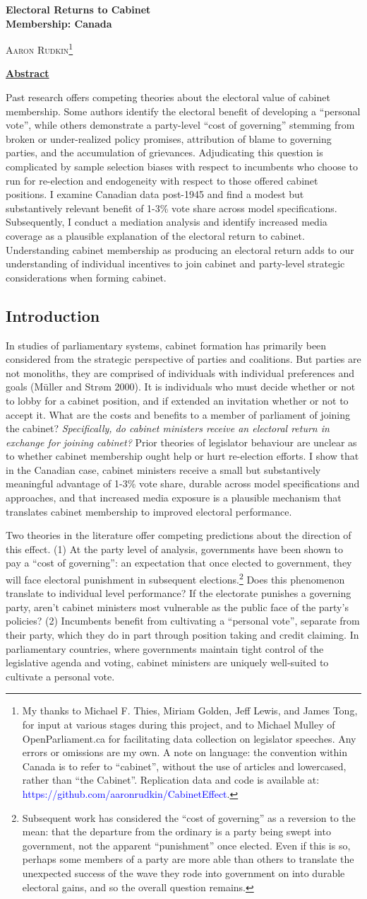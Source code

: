 \documentclass[letter,12pt]{article}
\newcommand*{\customTitle}{\begingroup
\pagestyle{empty}
\vspace*{0.05\textheight}
\noindent\Huge\bfseries Electoral Returns to Cabinet \\ Membership: Canada
\vspace*{0.05\textheight}

\noindent\Large \textsc{Aaron Rudkin\footnote{My thanks to Michael F. Thies, Miriam Golden, Jeff Lewis, and James Tong, for input at various stages during this project, and to Michael Mulley of OpenParliament.ca for facilitating data collection on legislator speeches. Any errors or omissions are my own. A note on language: the convention within Canada is to refer to ``cabinet'', without the use of articles and lowercased, rather than ``the Cabinet''. Replication data and code is available at: \textcolor{blue}{https://github.com/aaronrudkin/CabinetEffect}.}}
\vspace*{0.1\textheight}

\normalsize
\textbf{\underline{Abstract}}

\textmd{Past research offers competing theories about the electoral value of cabinet membership. Some authors identify the electoral benefit of developing a ``personal vote'', while others demonstrate a party-level ``cost of governing'' stemming from broken or under-realized policy promises, attribution of blame to governing parties, and the accumulation of grievances. Adjudicating this question is complicated by sample selection biases with respect to incumbents who choose to run for re-election and endogeneity with respect to those offered cabinet positions. I examine Canadian data post-1945 and find a modest but substantively relevant benefit of 1-3\% vote share across model specifications. Subsequently, I conduct a mediation analysis and identify increased media coverage as a plausible explanation of the electoral return to cabinet. Understanding cabinet membership as producing an electoral return adds to our understanding of individual incentives to join cabinet and party-level strategic considerations when forming cabinet.}

\newpage
\endgroup}
\begin{document}
\customTitle

\setlength{\parindent}{24pt}

\subsection*{Introduction}
In studies of parliamentary systems, cabinet formation has primarily been considered from the strategic perspective of parties and coalitions. But parties are not monoliths, they are comprised of individuals with individual preferences and goals (M{\"u}ller and Str{\o}m 2000). It is individuals who must decide whether or not to lobby for a cabinet position, and if extended an invitation whether or not to accept it. What are the costs and benefits to a member of parliament of joining the cabinet? \textit{Specifically, do cabinet ministers receive an electoral return in exchange for joining cabinet?} Prior theories of legislator behaviour are unclear as to whether cabinet membership ought help or hurt re-election efforts. I show that in the Canadian case, cabinet ministers receive a small but substantively meaningful advantage of 1-3\% vote share, durable across model specifications and approaches, and that increased media exposure is a plausible mechanism that translates cabinet membership to improved electoral performance.

Two theories in the literature offer competing predictions about the direction of this effect. (1) At the party level of analysis, governments have been shown to pay a ``cost of governing'': an expectation that once elected to government, they will face electoral punishment in subsequent elections.\footnote{Subsequent work has considered the ``cost of governing'' as a reversion to the mean: that the departure from the ordinary is a party being swept into government, not the apparent ``punishment'' once elected. Even if this is so, perhaps some members of a party are more able than others to translate the unexpected success of the wave they rode into government on into durable electoral gains, and so the overall question remains.} Does this phenomenon translate to individual level performance? If the electorate punishes a governing party, aren't cabinet ministers most vulnerable as the public face of the party's policies? (2) Incumbents benefit from cultivating a ``personal vote'', separate from their party, which they do in part through position taking and credit claiming. In parliamentary countries, where governments maintain tight control of the legislative agenda and voting, cabinet ministers are uniquely well-suited to cultivate a personal vote. 
\end{document}
